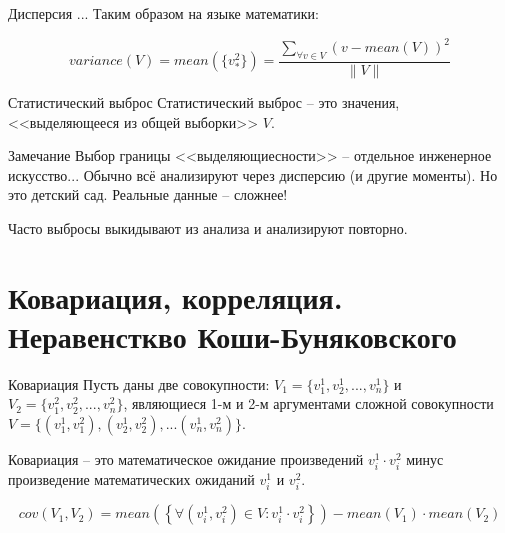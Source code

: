 \begin{frame}{Дисперсия}
	...
	Таким образом на языке математики:
	
	\begin{equation}
	variance(V) = mean(\{v_{*}^2\}) = \frac{\sum_{\forall v \in V} (v-mean(V))^2}{\lVert V \rVert}
	\end{equation}
	
	
\end{frame}

\begin{frame}{Статистический выброс}
	Статистический выброс -- это значения, <<выделяющееся из общей выборки>> $V$.
	
	\begin{block}{Замечание}
	Выбор границы <<выделяющиесности>> -- отдельное инженерное искусство...
	Обычно всё анализируют через дисперсию (и другие моменты). 
	Но это детский сад. Реальные данные -- сложнее!
	\end{block}

	Часто выбросы выкидывают из анализа и анализируют повторно.

\end{frame}

\section{Ковариация, корреляция. Неравенсткво Коши-Буняковского}\label{section:correlation}

\begin{frame}{Ковариация}
	Пусть даны две совокупности: 
	$V_1 = \{v_1^1, v_2^1, ..., v_n^1\}$ и
    $V_2 = \{v_1^2, v_2^2, ..., v_n^2\}$,
	являющиеся 1-м и 2-м аргументами сложной совокупности 
	$V = \{(v_1^1, v_1^2), (v_2^1, v_2^2), ... (v_n^1, v_n^2)\}$. 
	
	Ковариация -- это математическое ожидание произведений $v_i^1 \cdot v_i^2$ минус произведение математических ожиданий $v_i^1$ и $v_i^2$.
	
	\begin{equation}\label{eq:cov_def}
	cov(V_1, V_2) = mean(\left\{\forall (v^1_i, v^2_i) \in V: v^1_i \cdot v^2_i\right\}) - mean(V_1) \cdot mean(V_2)
	\end{equation}

\end{frame}

